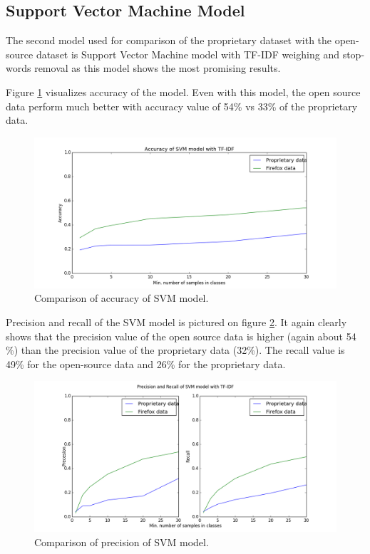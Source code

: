 \subsection{Support Vector Machine Model}

The second model used for comparison of the proprietary dataset with the open-source dataset is Support Vector Machine model with TF-IDF weighing and stop-words removal as this model shows the most promising results.

Figure \ref{fig:results.datasets.svm_accuracy} visualizes accuracy of the model. Even with this model, the open source data perform much better with accuracy value of 54\% vs 33\% of the proprietary data.

\begin{figure}[htbp]
    \centering
        \includegraphics[width=\textwidth]{./images/prop_vs_os/svm_accuracy.png}
    \caption{Comparison of accuracy of SVM model.}
    \label{fig:results.datasets.svm_accuracy}
\end{figure}

Precision and recall of the SVM model is pictured on figure \ref{fig:results.datasets.svm_pr}. It again clearly shows that the precision value of the open source data is higher (again about 54 \%) than the precision value of the proprietary data (32\%). The recall value is 49\% for the open-source data and 26\% for the proprietary data.

\begin{figure}[htbp]
    \centering
        \includegraphics[width=\textwidth]{./images/prop_vs_os/svm_precision_and_recall.png}
    \caption{Comparison of precision of SVM model.}
    \label{fig:results.datasets.svm_pr}
\end{figure}

